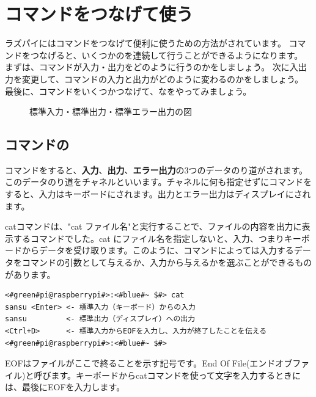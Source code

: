 \documentclass[text03.tex]{subfiles}
\begin{document}
\newpage
\section{コマンドをつなげて使う}
ラズパイにはコマンドをつなげて便利に使うための方法がされています。
コマンドをつなげると、いくつかのを連続して行うことができるようになります。
まずは、コマンドが入力・出力をどのように行うのかをしましょう。
次に入出力を変更して、コマンドの入力と出力がどのように変わるのかをしましょう。
最後に、コマンドをいくつかつなげて、なをやってみましょう。

\begin{figure}[h]
    \centering
    
    \caption{標準入力・標準出力・標準エラー出力の図}
    \label{ch03:stdioerr}
\end{figure}

\subsection{コマンドの}

コマンドをすると、{\bf {}入力}、{\bf {}出力}、{\bf {}エラー出力}の3つのデータのり道がされます。このデータのり道をチャネルといいます。チャネルに何も指定せずにコマンドをすると、入力はキーボードにされます。出力とエラー出力はディスプレイにされます。

catコマンドは、"cat ファイル名"と実行することで、ファイルの内容を出力に表示するコマンドでした。cat にファイル名を指定しないと、入力、つまりキーボードからデータを受け取ります。このように、コマンドによっては入力するデータをコマンドの引数として与えるか、入力から与えるかを選ぶことができるものがあります。

\begin{lstlisting}[caption=catの標準入力・標準出力, label=stdioCat]
<#green#pi@raspberrypi#>:<#blue#~ $#> cat 
sansu <Enter> <- 標準入力（キーボード）からの入力
sansu         <- 標準出力（ディスプレイ）への出力
<Ctrl+D>      <- 標準入力からEOFを入力し、入力が終了したことを伝える
<#green#pi@raspberrypi#>:<#blue#~ $#>
\end{lstlisting}
EOFはファイルがここで終ることを示す記号です。End Of File(エンドオブファイル)と呼びます。キーボードからcatコマンドを使って文字を入力するときには、最後にEOFを入力します。
\end{document}
